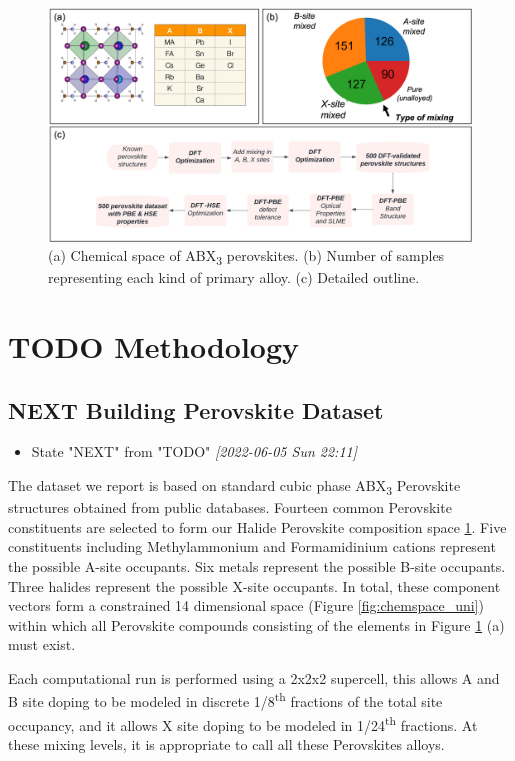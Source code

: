 \documentclass[twoside, twocolumn, 9pt, draft]{article}
\begin{document}
\printglossary
\printglossary[style=mcolindex, type=\acronymtype]

\begin{figure}
\centering
\includegraphics[h,width=.9\linewidth]{outline.png}
\caption{\label{fig:outline} (a) Chemical space of ABX\textsubscript{3} perovskites. (b) Number of samples representing each kind of primary alloy. (c) Detailed outline.}
\end{figure}

\section*{{\bfseries\sffamily TODO} Methodology}
\label{sec:org8240ddc}
\subsection*{{\bfseries\sffamily NEXT} Building Perovskite Dataset}
\label{sec:org604959b}
\begin{itemize}
\item State "NEXT"       from "TODO"       \textit{[2022-06-05 Sun 22:11]}
\end{itemize}
The dataset we report is based on standard cubic phase ABX\textsubscript{3}
Perovskite structures obtained from public databases. Fourteen common
Perovskite constituents are selected to form our Halide Perovskite
composition space \ref{fig:outline}. Five constituents including
Methylammonium and Formamidinium cations represent the possible A-site
occupants. Six metals represent the possible B-site occupants. Three
halides represent the possible X-site occupants. In total, these
component vectors form a constrained 14 dimensional space (Figure
\ref{fig:chemspace_uni}) within which all Perovskite compounds
consisting of the elements in Figure \ref{fig:outline} (a) must exist.

Each computational run is performed using a 2x2x2 supercell, this
allows A and B site doping to be modeled in discrete 1/8\textsuperscript{th} fractions
of the total site occupancy, and it allows X site doping to be modeled
in 1/24\textsuperscript{th} fractions. At these mixing levels, it is appropriate to
call all these Perovskites alloys.
\end{document}
